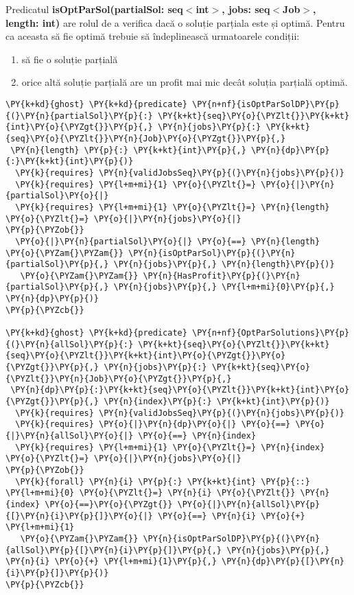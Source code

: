Predicatul \textbf{isOptParSol(partialSol: seq$<$int$>$, jobs: seq$<$Job$>$, length: int)} are rolul de a verifica dacă o soluție parțiala este și optimă. Pentru ca aceasta să fie optimă trebuie să îndeplinească urmatoarele condiții:
\begin{enumerate}
    \item să fie o soluție parțială
    \item orice altă soluție parțială are un profit mai mic decât soluția parțială optimă.
\end{enumerate}

\begin{Verbatim}[commandchars=\\\{\}, fontsize=\small]
\PY{k+kd}{ghost} \PY{k+kd}{predicate} \PY{n+nf}{isOptParSolDP}\PY{p}{(}\PY{n}{partialSol}\PY{p}{:} \PY{k+kt}{seq}\PY{o}{\PYZlt{}}\PY{k+kt}{int}\PY{o}{\PYZgt{}}\PY{p}{,} \PY{n}{jobs}\PY{p}{:} \PY{k+kt}{seq}\PY{o}{\PYZlt{}}\PY{n}{Job}\PY{o}{\PYZgt{}}\PY{p}{,}
 \PY{n}{length} \PY{p}{:} \PY{k+kt}{int}\PY{p}{,} \PY{n}{dp}\PY{p}{:}\PY{k+kt}{int}\PY{p}{)}
  \PY{k}{requires} \PY{n}{validJobsSeq}\PY{p}{(}\PY{n}{jobs}\PY{p}{)}
  \PY{k}{requires} \PY{l+m+mi}{1} \PY{o}{\PYZlt{}=} \PY{o}{|}\PY{n}{partialSol}\PY{o}{|}
  \PY{k}{requires} \PY{l+m+mi}{1} \PY{o}{\PYZlt{}=} \PY{n}{length} \PY{o}{\PYZlt{}=} \PY{o}{|}\PY{n}{jobs}\PY{o}{|}
\PY{p}{\PYZob{}}
  \PY{o}{|}\PY{n}{partialSol}\PY{o}{|} \PY{o}{==} \PY{n}{length} \PY{o}{\PYZam{}\PYZam{}} \PY{n}{isOptParSol}\PY{p}{(}\PY{n}{partialSol}\PY{p}{,} \PY{n}{jobs}\PY{p}{,} \PY{n}{length}\PY{p}{)}
   \PY{o}{\PYZam{}\PYZam{}} \PY{n}{HasProfit}\PY{p}{(}\PY{n}{partialSol}\PY{p}{,} \PY{n}{jobs}\PY{p}{,} \PY{l+m+mi}{0}\PY{p}{,}  \PY{n}{dp}\PY{p}{)}
\PY{p}{\PYZcb{}}

\PY{k+kd}{ghost} \PY{k+kd}{predicate} \PY{n+nf}{OptParSolutions}\PY{p}{(}\PY{n}{allSol}\PY{p}{:} \PY{k+kt}{seq}\PY{o}{\PYZlt{}}\PY{k+kt}{seq}\PY{o}{\PYZlt{}}\PY{k+kt}{int}\PY{o}{\PYZgt{}}\PY{o}{\PYZgt{}}\PY{p}{,} \PY{n}{jobs}\PY{p}{:} \PY{k+kt}{seq}\PY{o}{\PYZlt{}}\PY{n}{Job}\PY{o}{\PYZgt{}}\PY{p}{,}
 \PY{n}{dp}\PY{p}{:}\PY{k+kt}{seq}\PY{o}{\PYZlt{}}\PY{k+kt}{int}\PY{o}{\PYZgt{}}\PY{p}{,} \PY{n}{index}\PY{p}{:} \PY{k+kt}{int}\PY{p}{)}
  \PY{k}{requires} \PY{n}{validJobsSeq}\PY{p}{(}\PY{n}{jobs}\PY{p}{)}
  \PY{k}{requires} \PY{o}{|}\PY{n}{dp}\PY{o}{|} \PY{o}{==} \PY{o}{|}\PY{n}{allSol}\PY{o}{|} \PY{o}{==} \PY{n}{index}
  \PY{k}{requires} \PY{l+m+mi}{1} \PY{o}{\PYZlt{}=} \PY{n}{index} \PY{o}{\PYZlt{}=} \PY{o}{|}\PY{n}{jobs}\PY{o}{|}
\PY{p}{\PYZob{}}
  \PY{k}{forall} \PY{n}{i} \PY{p}{:} \PY{k+kt}{int} \PY{p}{::} \PY{l+m+mi}{0} \PY{o}{\PYZlt{}=} \PY{n}{i} \PY{o}{\PYZlt{}} \PY{n}{index} \PY{o}{==}\PY{o}{\PYZgt{}} \PY{o}{|}\PY{n}{allSol}\PY{p}{[}\PY{n}{i}\PY{p}{]}\PY{o}{|} \PY{o}{==} \PY{n}{i} \PY{o}{+} \PY{l+m+mi}{1} 
   \PY{o}{\PYZam{}\PYZam{}} \PY{n}{isOptParSolDP}\PY{p}{(}\PY{n}{allSol}\PY{p}{[}\PY{n}{i}\PY{p}{]}\PY{p}{,} \PY{n}{jobs}\PY{p}{,} \PY{n}{i} \PY{o}{+} \PY{l+m+mi}{1}\PY{p}{,} \PY{n}{dp}\PY{p}{[}\PY{n}{i}\PY{p}{]}\PY{p}{)}
\PY{p}{\PYZcb{}}
\end{Verbatim}

